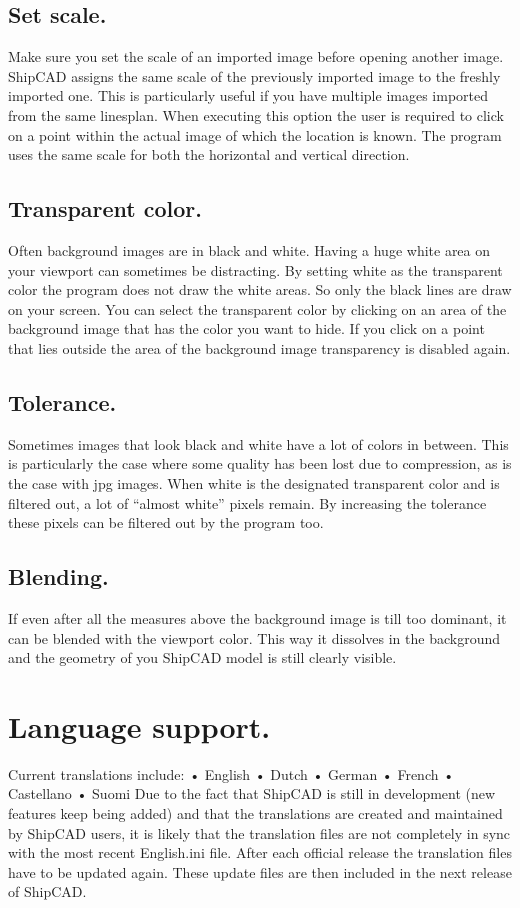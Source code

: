 \documentclass[12pt]{article}
\begin{document}
\subsection{Set scale.}
Make sure you set the scale of an imported image before opening another image. ShipCAD
assigns the same scale of the previously imported image to the freshly imported one. This is
particularly useful if you have multiple images imported from the same linesplan. When executing
this option the user is required to click on a point within the actual image of which the location is
known. The program uses the same scale for both the horizontal and vertical direction.

\subsection{Transparent color.}
Often background images are in black and white. Having a huge white area on your viewport can
sometimes be distracting. By setting white as the transparent color the program does not draw the
white areas. So only the black lines are draw on
your screen. You can select the transparent color
by clicking on an area of the background image
that has the color you want to hide. If you click on
a point that lies outside the area of the
background image transparency is disabled
again.

\subsection{Tolerance.}
Sometimes images that look black and white
have a lot of colors in between. This is
particularly the case where some quality has
been lost due to compression, as is the case
with jpg images. When white is the designated
transparent color and is filtered out, a lot of
“almost white” pixels remain. By increasing the
tolerance these pixels can be filtered out by the
program too.

\subsection{Blending.}
If even after all the measures above the background image is till too dominant, it can be blended
with the viewport color. This way it dissolves in the background and the geometry of you ShipCAD
model is still clearly visible.

\section{Language support.}
Current translations include:
•
 English
•
 Dutch
•
 German
•
 French
•
 Castellano
•
 Suomi
Due to the fact that ShipCAD is still in development (new features keep being added) and that the
translations are created and maintained by ShipCAD users, it is likely that the translation files are
not completely in sync with the most recent English.ini file. After each official release the translation
files have to be updated again. These update files are then included in the next release of
ShipCAD.
\end{document}
